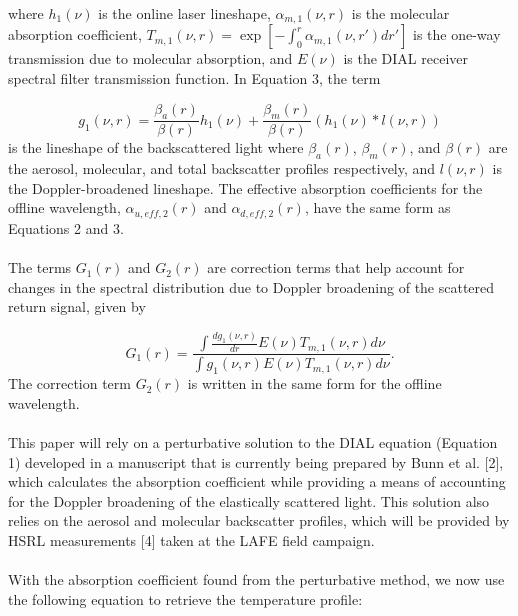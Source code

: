 \documentclass[twoside]{article}
\begin{document}
\noindent where $h_1(\nu)$ is the online laser lineshape, $\alpha_{m,1}(\nu,r)$ is the molecular absorption coefficient, $T_{m,1}(\nu,r) = \exp\left[-\int^r_0 \alpha_{m,1}(\nu,r')dr'\right]$ is the one-way transmission due to molecular absorption, and $E(\nu)$ is the DIAL receiver spectral filter transmission function. 
In Equation 3, the term

\begin{equation}
	g_1(\nu,r) = \frac{\beta_a(r)}{\beta(r)} h_{1}(\nu) + \frac{\beta_m(r)}{\beta(r)} (h_{1}(\nu)\ast l(\nu,r))
\end{equation}
\noindent is the lineshape of the backscattered light where $\beta_a(r)$, $\beta_m(r)$, and $\beta(r)$ are the aerosol, molecular, and total backscatter profiles respectively, and $l(\nu,r)$ is the Doppler-broadened lineshape. 
The effective absorption coefficients for the offline wavelength, $\alpha_{u,eff,2}(r)$ and $\alpha_{d,eff,2}(r)$, have the same form as Equations 2 and 3.
\\
\\
The terms $G_1(r)$ and $G_2(r)$ are correction terms that help account for changes in the spectral distribution due to Doppler broadening of the scattered return signal, given by

\begin{equation}
	G_1(r) = \frac{\int \frac{dg_1(\nu,r)}{dr} E(\nu) T_{m,1}(\nu,r) d\nu}{\int g_1(\nu,r) E(\nu) T_{m,1}(\nu,r) d\nu}.
\end{equation}
\noindent The correction term $G_2(r)$ is written in the same form for the offline wavelength.
\\
\\
This paper will rely on a perturbative solution to the DIAL equation (Equation 1) developed in a manuscript that is currently being prepared by Bunn et al. [2], which calculates the absorption coefficient while providing a means of accounting for the Doppler broadening of the elastically scattered light. 
This solution also relies on the aerosol and molecular backscatter profiles, which will be provided by HSRL measurements [4] taken at the LAFE field campaign.
\\
\\
With the absorption coefficient found from the perturbative method, we now use the following equation to retrieve the temperature profile:
\end{document}
